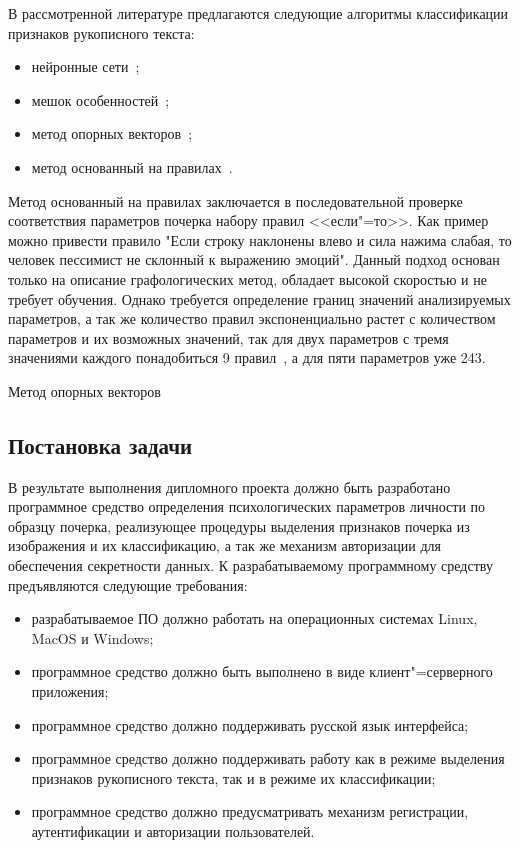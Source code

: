 В рассмотренной литературе предлагаются следующие алгоритмы классификации признаков рукописного текста:
\begin{itemize}
  \item нейронные сети~\cite{champa_ananda_kumar_ann, grewal_prashar, gabrani_solomon_dviwe,puri_lakhwani, dang_kumar, kathait_singh};
  \item мешок особенностей~\cite{rothacker_bag_of_features};
  \item метод опорных векторов~\cite{slideshare_khandelwal_garg, gabrani_solomon_dviwe, prasad_singh_sapre};
  \item метод основанный на правилах~\cite{champa_ananda_kumar_rule_base}.
\end{itemize}

Метод основанный на правилах заключается в последовательной проверке соответствия параметров почерка набору правил <<если"=то>>. Как пример можно привести правило "Если строку наклонены влево и сила нажима слабая, то человек пессимист не склонный к выражению эмоций". Данный подход основан только на описание графологических метод, обладает высокой скоростью и не требует обучения. Однако требуется определение границ значений анализируемых параметров, а так же количество правил экспоненциально растет с количеством параметров и их возможных значений, так для двух параметров с тремя значениями каждого понадобиться 9 правил~\cite{champa_ananda_kumar_rule_base}, а для пяти параметров уже 243.

Метод опорных векторов 

\subsection{Постановка задачи}
В результате выполнения дипломного проекта должно быть разработано программное средство определения психологических параметров личности по образцу почерка, реализующее процедуры выделения признаков почерка из изображения и их классификацию, а так же механизм авторизации для обеспечения секретности данных. К разрабатываемому программному средству предъявляются следующие требования:
\begin{itemize}
\item разрабатываемое ПО должно работать на операционных системах Linux, MacOS и Windows;
\item программное средство должно быть выполнено в виде клиент"=серверного приложения;
\item программное средство должно поддерживать русской язык интерфейса;
\item программное средство должно поддерживать работу как в режиме выделения признаков рукописного текста, так и в режиме их классификации;
\item программное средство должно предусматривать механизм регистрации, аутентификации и авторизации пользователей.
\end{itemize}

